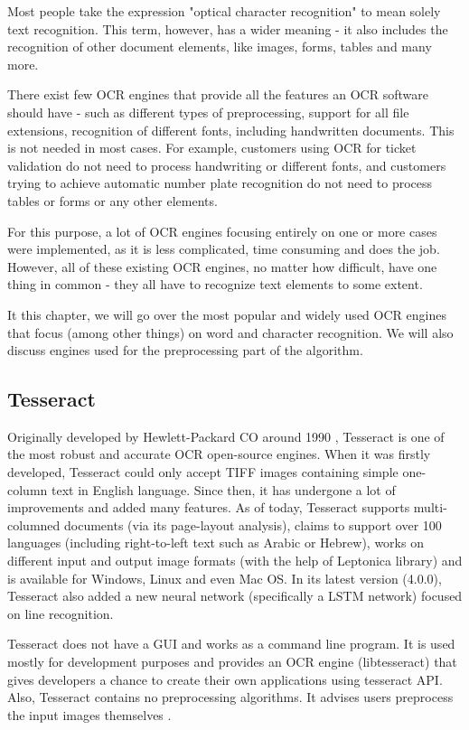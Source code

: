 Most people take the expression "optical character recognition" to mean solely text recognition. This term, however, has a wider meaning - it also includes the recognition of other document elements, like images, forms, tables and many more.

There exist few OCR engines that provide all the features an OCR software should have - such as different types of preprocessing, support for all file extensions, recognition of different fonts, including handwritten documents. This is not needed in most cases. For example, customers using OCR for ticket validation do not need to process handwriting or different fonts, and customers trying to achieve automatic number plate recognition do not need to process tables or forms or any other elements.

For this purpose, a lot of OCR engines focusing entirely on one or more cases were implemented, as it is less complicated, time consuming and does the job. However, all of these existing OCR engines, no matter how difficult, have one thing in common - they all have to recognize text elements to some extent.

It this chapter, we will go over the most popular and widely used OCR engines that focus (among other things) on word and character recognition. We will also discuss engines used for the preprocessing part of the algorithm.

\subsection{Tesseract}

Originally developed by Hewlett-Packard CO around 1990 \citep{TesseractGIT}, Tesseract is one of the most robust and accurate OCR open-source engines. When it was firstly developed, Tesseract could only accept TIFF images containing simple one-column text in English language. Since then, it has undergone a lot of improvements and added many features. As of today, Tesseract supports multi-columned documents (via its page-layout analysis), claims to support over 100 languages (including right-to-left text such as Arabic or Hebrew), works on different input and output image formats (with the help of Leptonica \citep{LeptonicaLIB} library) and is available for Windows, Linux and even Mac OS. In its latest version (4.0.0), Tesseract also added a new neural network (specifically a LSTM network) focused on line recognition. 

Tesseract does not have a GUI and works as a command line program. It is used mostly for development purposes and provides an OCR engine (libtesseract) that gives developers a chance to create their own applications using tesseract API. Also, Tesseract contains no preprocessing algorithms. It advises users preprocess the input images themselves \citep{TesseractQual}.

